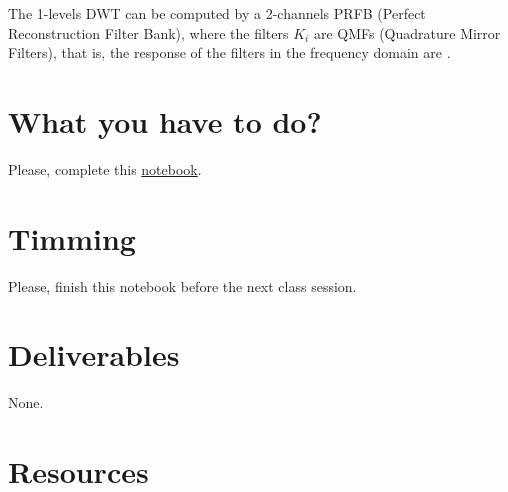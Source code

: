 The 1-levels DWT can be computed by a 2-channels PRFB (Perfect
Reconstruction Filter Bank), where the filters $K_i$ are QMFs
(Quadrature Mirror Filters), that is, the response of the filters in the frequency domain are .

\section{What you have to do?}
  
Please, complete this
\href{https://github.com/Sistemas-Multimedia/Sistemas-Multimedia.github.io/blob/master/study_guide/MDWT/MDWT.ipynb}{notebook}.

\section{Timming}

Please, finish this notebook before the next class session.

\section{Deliverables}

None.

\section{Resources}


